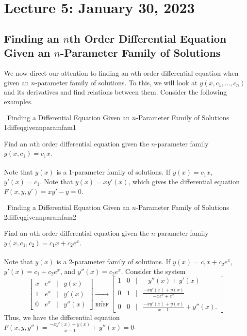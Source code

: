    \pagebreak

\section{Lecture 5: January 30, 2023}

    \subsection{Finding an \(n\)th Order Differential Equation Given an \(n\)-Parameter Family of Solutions}

        We now direct our attention to finding an \(n\)th order differential equation when given an \(n\)-parameter family of solutions. To this, we will look at \(y(x,c_1,\ldots,c_n)\) and its derivatives and find relations between them. Consider the following examples.
        \begin{example}{\Difficulty\,\Difficulty\,\,Finding a Differential Equation Given an \(n\)-Parameter Family of Solutions 1}{diffeqgivennparamfam1}
            
            Find an \(n\)th order differential equation given the \(n\)-parameter family \(y(x,c_1)=c_1x\).
            \\
            \\
            Note that \(y(x)\) is a \(1\)-parameter family of solutions. If \(y(x)=c_1x\), \(y'(x)=c_1\). Note that \(y(x)=xy'(x)\), which gives the differential equation \(F(x,y,y')=xy'-y=0\).

        \end{example}
        \begin{example}{\Difficulty\,\Difficulty\,\,Finding a Differential Equation Given an \(n\)-Parameter Family of Solutions 2}{diffeqgivennparamfam2}
            
            Find an \(n\)th order differential equation given the \(n\)-parameter family \(y(x,c_1,c_2)=c_1x+c_2e^x\).
            \\
            \\
            Note that \(y(x)\) is a \(2\)-parameter family of solutions. If \(y(x)=c_1x+c_2e^x\), \(y'(x)=c_1+c_2e^x\), and \(y''(x)=c_2e^x\). Consider the system
            \begin{equation*}
                \begin{bmatrix}
                    x & e^x & | & y(x) \\
                    1 & e^x & | & y'(x) \\
                    0 & e^x & | & y''(x)
                \end{bmatrix}\underbrace{\to}_{\text{RREF}}
                \begin{bmatrix}
                    1 & 0 & | & -y''(x)+y'(x) \\
                    0 & 1 & | & \frac{-xy'(x)+y(x)}{-xe^x+e^x} \\
                    0 & 0 & | & \frac{-xy'(x)+y(x)}{x-1}+y''(x).
                \end{bmatrix}
            \end{equation*}
            Thus, we have the differential equation \(F(x,y,y'')=\frac{-xy'(x)+y(x)}{x-1}+y''(x)=0\).
        \end{example}
